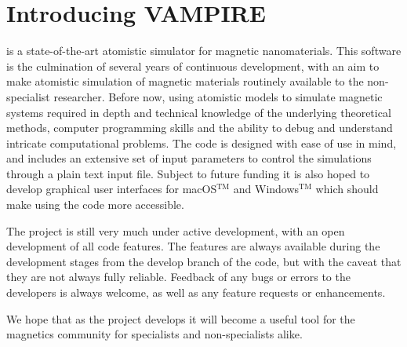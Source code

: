 \chapter*{Introducing {\Huge VAMPIRE}}

\vampire is a state-of-the-art atomistic simulator for magnetic nanomaterials.
This software is the culmination of several years of continuous development,
with an aim to make atomistic simulation of magnetic materials routinely
available to the non-specialist researcher. Before now, using atomistic
models to simulate magnetic systems required in depth and technical knowledge
of the underlying theoretical methods, computer programming skills and the
ability to debug and understand intricate computational problems. The code is
designed with ease of use in mind, and includes an extensive set of input
parameters to control the simulations through a plain text input file. Subject
to future funding it is also hoped to develop graphical user interfaces for
macOS$^{\mathrm{TM}}$ and Windows$^{\mathrm{TM}}$ which should make using
the code more accessible.

The \vampire project is still very much under active development, with an open
development of all code features. The features are always available during the
development stages from the develop branch of the code, but with the caveat that
they are not always fully reliable. Feedback of any bugs or errors to the
\vampire developers is always welcome, as well as any feature requests or
enhancements.

We hope that as the \vampire project develops it will become a useful tool for
the magnetics community for specialists and non-specialists alike.